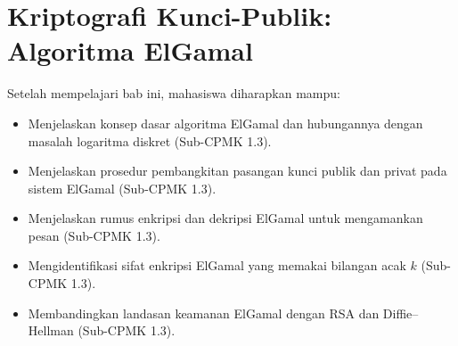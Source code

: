 \documentclass[../../main.tex]{subfiles}
\begin{document}
\chapter{Kriptografi Kunci-Publik: Algoritma ElGamal}
\label{chap:elgamal}

\begin{learningoutcome}
Setelah mempelajari bab ini, mahasiswa diharapkan mampu:
\begin{itemize}
    \item Menjelaskan konsep dasar algoritma ElGamal dan hubungannya dengan masalah logaritma diskret (Sub-CPMK 1.3).
    \item Menjelaskan prosedur pembangkitan pasangan kunci publik dan privat pada sistem ElGamal (Sub-CPMK 1.3).
    \item Menjelaskan rumus enkripsi dan dekripsi ElGamal untuk mengamankan pesan (Sub-CPMK 1.3).
    \item Mengidentifikasi sifat enkripsi ElGamal yang memakai bilangan acak $k$ (Sub-CPMK 1.3).
    \item Membandingkan landasan keamanan ElGamal dengan RSA dan Diffie--Hellman (Sub-CPMK 1.3).
\end{itemize}
\end{learningoutcome}










\end{document}
